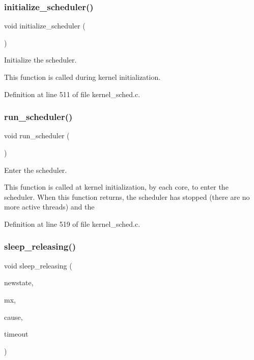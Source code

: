 \subsubsection{\texorpdfstring{initialize\+\_\+scheduler()}{initialize\_scheduler()}}
{\footnotesize\ttfamily void initialize\+\_\+scheduler (\begin{DoxyParamCaption}\item[{void}]{ }\end{DoxyParamCaption})}



Initialize the scheduler. 

This function is called during kernel initialization. 

Definition at line 511 of file kernel\+\_\+sched.\+c.

\mbox{\label{group__scheduler_ga147600b59d656eb9d9558673c2fad36d}} 
\subsubsection{\texorpdfstring{run\+\_\+scheduler()}{run\_scheduler()}}
{\footnotesize\ttfamily void run\+\_\+scheduler (\begin{DoxyParamCaption}\item[{void}]{ }\end{DoxyParamCaption})}



Enter the scheduler. 

This function is called at kernel initialization, by each core, to enter the scheduler. When this function returns, the scheduler has stopped (there are no more active threads) and the 

Definition at line 519 of file kernel\+\_\+sched.\+c.

\mbox{\label{group__scheduler_ga0ab1a2dcfbfe3fb09cc24044efddfd34}} 
\subsubsection{\texorpdfstring{sleep\+\_\+releasing()}{sleep\_releasing()}}
{\footnotesize\ttfamily void sleep\+\_\+releasing (\begin{DoxyParamCaption}\item[{\hyperlink{group__scheduler_ga6c969c169777f82c104cf73e501df70f}{Thread\+\_\+state}}]{newstate,  }\item[{\hyperlink{group__syscalls_gaef2ec62cae8e0031fd19fc8b91083ade}{Mutex} $\ast$}]{mx,  }\item[{enum \hyperlink{group__scheduler_gaad787d8d80312ffca3c0f197b3a25fbe}{S\+C\+H\+E\+D\+\_\+\+C\+A\+U\+SE}}]{cause,  }\item[{\hyperlink{bios_8h_ae7291e5cd742fb9bc6d4aaa0d51bd0ee}{Timer\+Duration}}]{timeout }\end{DoxyParamCaption})}



